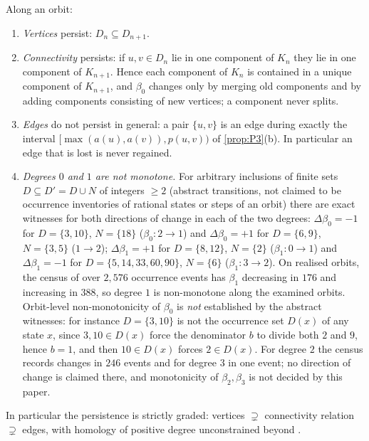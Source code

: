 \begin{proposition}\label{prop:P6}
Along an orbit:
\begin{enumerate}[label=(\alph*),itemsep=1pt]
\item \emph{Vertices} persist: $D_n\subseteq D_{n+1}$.
\item \emph{Connectivity} persists: if $u,v\in D_n$ lie in one component of $K_n$ they lie in one component of $K_{n+1}$. Hence each component of $K_n$ is contained in a unique component of $K_{n+1}$, and $\beta_0$ changes only by merging old components and by adding components consisting of new vertices; a component never splits.
\item \emph{Edges} do not persist in general: a pair $\{u,v\}$ is an edge during exactly the interval $[\max(a(u),a(v)),p(u,v))$ of \cref{prop:P3}(b). In particular an edge that is lost is never regained.
\item \emph{Degrees $0$ and $1$ are not monotone.} For arbitrary inclusions of finite sets $D\subseteq D'=D\cup N$ of integers $\ge2$ (abstract transitions, not claimed to be occurrence inventories of rational states or steps of an orbit) there are exact witnesses for both directions of change in each of the two degrees: $\Delta\beta_0=-1$ for $D=\{3,10\}$, $N=\{18\}$ ($\beta_0:2\to1$) and $\Delta\beta_0=+1$ for $D=\{6,9\}$, $N=\{3,5\}$ ($1\to2$); $\Delta\beta_1=+1$ for $D=\{8,12\}$, $N=\{2\}$ ($\beta_1:0\to1$) and $\Delta\beta_1=-1$ for $D=\{5,14,33,60,90\}$, $N=\{6\}$ ($\beta_1:3\to2$). On realised orbits, the census of  over $2{,}576$ occurrence events has $\beta_1$ decreasing in $176$ and increasing in $388$, so degree $1$ is non-monotone along the examined orbits. Orbit-level non-monotonicity of $\beta_0$ is \emph{not} established by the abstract witnesses: for instance $D=\{3,10\}$ is not the occurrence set $D(x)$ of any state $x$, since $3,10\in D(x)$ force the denominator $b$ to divide both $2$ and $9$, hence $b=1$, and then $10\in D(x)$ forces $2\in D(x)$. For degree $2$ the census records changes in $246$ events and for degree $3$ in one event; no direction of change is claimed there, and monotonicity of $\beta_2,\beta_3$ is not decided by this paper.
\end{enumerate}
In particular the persistence is strictly graded: vertices $\supsetneq$ connectivity relation $\supsetneq$ edges, with homology of positive degree unconstrained beyond .
\end{proposition}
